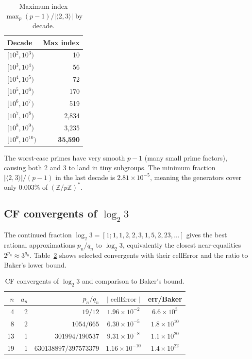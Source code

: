 \documentclass[11pt,a4paper]{article}
\begin{document}
\begin{table}[h]
\centering
\caption{Maximum index $\max_p (p-1)/|\langle 2,3 \rangle|$ by decade.}
\label{tab:maxindex}
\begin{tabular}{lr}
\toprule
Decade & Max index \\
\midrule
$[10^2, 10^3)$ & 10 \\
$[10^3, 10^4)$ & 56 \\
$[10^4, 10^5)$ & 72 \\
$[10^5, 10^6)$ & 170 \\
$[10^6, 10^7)$ & 519 \\
$[10^7, 10^8)$ & 2,834 \\
$[10^8, 10^9)$ & 3,235 \\
$[10^9, 10^{10})$ & \textbf{35,590} \\
\bottomrule
\end{tabular}
\end{table}

The worst-case primes have very smooth $p - 1$ (many small prime factors),
causing both 2 and 3 to land in tiny subgroups.
The minimum fraction $|\langle 2, 3\rangle|/(p-1)$ in the last decade
is $2.81 \times 10^{-5}$, meaning the generators cover only
$0.003\%$ of $(\mathbb{Z}/p\mathbb{Z})^*$.

\subsection{CF convergents of $\log_2 3$}

The continued fraction $\log_2 3 = [1; 1, 1, 2, 2, 3, 1, 5, 2, 23, \ldots]$
gives the best rational approximations $p_n/q_n$ to $\log_2 3$,
equivalently the closest near-equalities $2^{p_n} \approx 3^{q_n}$.
Table~\ref{tab:cf} shows selected convergents with their cellError
and the ratio to Baker's lower bound.

\begin{table}[h]
\centering
\caption{CF convergents of $\log_2 3$ and comparison to Baker's bound.}
\label{tab:cf}
\begin{tabular}{rrrcc}
\toprule
$n$ & $a_n$ & $p_n/q_n$ & $|\operatorname{cellError}|$ & err/Baker \\
\midrule
4  & 2  & $19/12$              & $1.96 \times 10^{-2}$  & $6.6 \times 10^3$ \\
8  & 2  & $1054/665$           & $6.30 \times 10^{-5}$  & $1.8 \times 10^{10}$ \\
13 & 1  & $301994/190537$      & $9.31 \times 10^{-8}$  & $1.1 \times 10^{20}$ \\
19 & 1  & $630138897/397573379$& $1.16 \times 10^{-10}$ & $1.4 \times 10^{22}$ \\
\bottomrule
\end{tabular}
\end{table}
\end{document}
